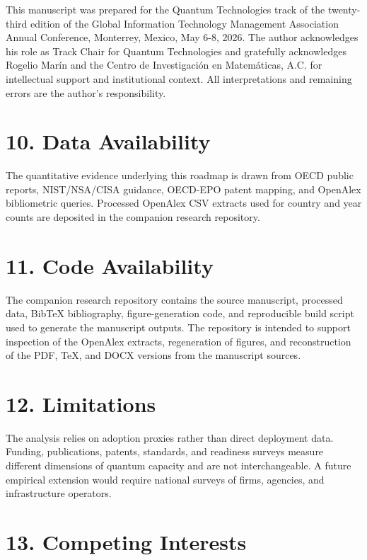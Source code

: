 \documentclass[
  11pt,
  letterpaper,
]{article}
\begin{document}
This manuscript was prepared for the Quantum Technologies track of the
twenty-third edition of the Global Information Technology Management
Association Annual Conference, Monterrey, Mexico, May 6-8, 2026. The
author acknowledges his role as Track Chair for Quantum Technologies and
gratefully acknowledges Rogelio Marín and the Centro de Investigación en
Matemáticas, A.C. for intellectual support and institutional context.
All interpretations and remaining errors are the author's
responsibility.

\section{10. Data Availability}\label{data-availability}

The quantitative evidence underlying this roadmap is drawn from OECD
public reports, NIST/NSA/CISA guidance, OECD-EPO patent mapping, and
OpenAlex bibliometric queries. Processed OpenAlex CSV extracts used for
country and year counts are deposited in the companion research
repository.

\section{11. Code Availability}\label{code-availability}

The companion research repository contains the source manuscript,
processed data, BibTeX bibliography, figure-generation code, and
reproducible build script used to generate the manuscript outputs. The
repository is intended to support inspection of the OpenAlex extracts,
regeneration of figures, and reconstruction of the PDF, TeX, and DOCX
versions from the manuscript sources.

\section{12. Limitations}\label{limitations}

The analysis relies on adoption proxies rather than direct deployment
data. Funding, publications, patents, standards, and readiness surveys
measure different dimensions of quantum capacity and are not
interchangeable. A future empirical extension would require national
surveys of firms, agencies, and infrastructure operators.

\section{13. Competing Interests}\label{competing-interests}
\end{document}
